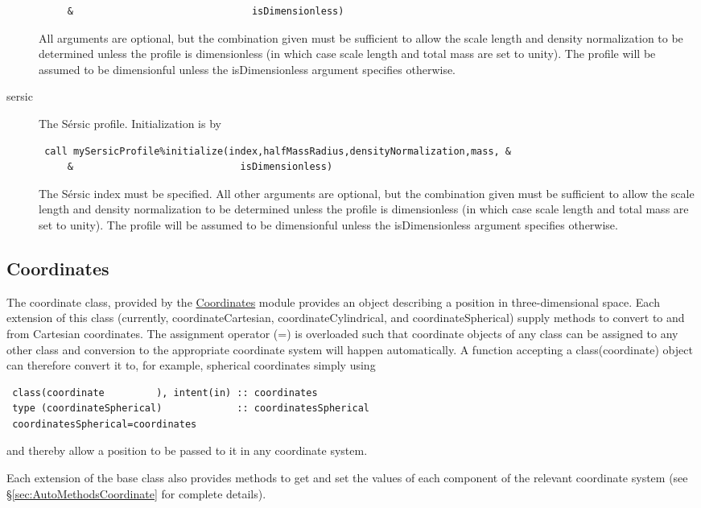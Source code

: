 \begin{description}
\begin{verbatim}
     &                               isDimensionless)
\end{verbatim}
All arguments are optional, but the combination given must be sufficient to allow the scale length and density normalization to be determined unless the profile is dimensionless (in which case scale length and total mass are set to unity). The profile will be assumed to be dimensionful unless the {\normalfont \ttfamily isDimensionless} argument specifies otherwise.
 \item [{\normalfont \ttfamily sersic}] The S\'ersic \citep{sersic_influence_1963} profile. Initialization is by
\begin{verbatim}
 call mySersicProfile%initialize(index,halfMassRadius,densityNormalization,mass, &
     &                             isDimensionless)
\end{verbatim}
The S\'ersic {\normalfont \ttfamily index} must be specified. All other arguments are optional, but the combination given must be sufficient to allow the scale length and density normalization to be determined unless the profile is dimensionless (in which case scale length and total mass are set to unity). The profile will be assumed to be dimensionful unless the {\normalfont \ttfamily isDimensionless} argument specifies otherwise.
\end{description}

\subsection{Coordinates}\label{sec:Coordinates}

The {\normalfont \ttfamily coordinate} class, provided by the \hyperlink{objects.coordinates.F90:coordinates}{\normalfont \ttfamily Coordinates} module provides an object describing a position in three-dimensional space. Each extension of this class (currently, {\normalfont \ttfamily coordinateCartesian}, {\normalfont \ttfamily coordinateCylindrical}, and {\normalfont \ttfamily coordinateSpherical}) supply methods to convert to and from Cartesian coordinates. The assignment operator ({\normalfont \ttfamily =}) is overloaded such that coordinate objects of any class can be assigned to any other class and conversion to the appropriate coordinate system will happen automatically. A function accepting a {\normalfont \ttfamily class(coordinate)} object can therefore convert it to, for example, spherical coordinates simply using
\begin{verbatim}
 class(coordinate         ), intent(in) :: coordinates
 type (coordinateSpherical)             :: coordinatesSpherical
 coordinatesSpherical=coordinates
\end{verbatim}
and thereby allow a position to be passed to it in any coordinate system.

Each extension of the base class also provides methods to get and set the values of each component of the relevant coordinate system (see \S\ref{sec:AutoMethodsCoordinate} for complete details).
